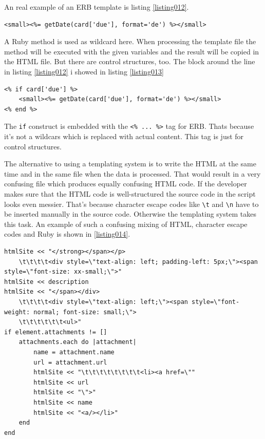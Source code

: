 An real example of an ERB template is listing \ref{listing012}.

\begin{lstlisting}[aboveskip=1\baselineskip, caption=Ruby method in ERB template., label=listing012]
<small><%= getDate(card['due'], format='de') %></small>
\end{lstlisting}

A Ruby method is used as wildcard here. When processing the template file the method will be executed with the given variables and the result will be copied in the HTML file. But there are control structures, too. The block around the line in listing \ref{listing012} i showed in listing \ref{listing013}

\begin{lstlisting}[aboveskip=1\baselineskip, caption=Ruby method in ERB template., label=listing013]
<% if card['due'] %>
	<small><%= getDate(card['due'], format='de') %></small>
<% end %>
\end{lstlisting}

The \lstinline{if} construct is embedded with the \lstinline{<% ... %>} tag for ERB. Thats because it's not a wildcars which is replaced with actual content. This tag is just for control structures.

The alternative to using a templating system is to write the HTML at the same time and in the same file when the data is processed. That would result in a very confusing file which produces equally confusing HTML code. If the developer makes sure that the HTML code is well-structured the source code in the script looks even messier. That's because character escape codes like \lstinline{\t} and \lstinline{\n} have to be inserted manually in the source code. Otherwise the templating system takes this task. An example of such a confusing mixing of HTML, character escape codes and Ruby is shown in \ref{listing014}.

\begin{lstlisting}[aboveskip=1\baselineskip, caption=Generating HTML without a templating engine., label=listing014]
htmlSite << "</strong></span></p>
	\t\t\t\t<div style=\"text-align: left; padding-left: 5px;\"><span style=\"font-size: xx-small;\">"
htmlSite << description		
htmlSite << "</span></div>
	\t\t\t\t<div style=\"text-align: left;\"><span style=\"font-weight: normal; font-size: small;\"> 
	\t\t\t\t\t\t<ul>"
if element.attachments != []
	attachments.each do |attachment|
		name = attachment.name
		url = attachment.url
		htmlSite << "\t\t\t\t\t\t\t\t<li><a href=\""
		htmlSite << url
		htmlSite << "\">"
		htmlSite << name
		htmlSite << "<a/></li>"
	end	
end	
\end{lstlisting}

